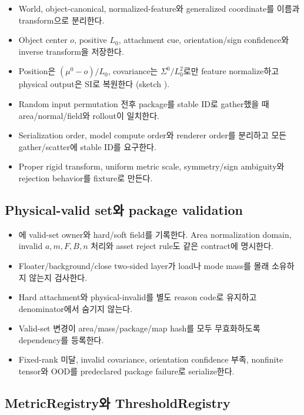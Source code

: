 \documentclass[10pt]{article}
\begin{document}
\begin{itemize}
  \item[$\square$] World, object-canonical, normalized-feature와 generalized coordinate를 이름과 transform으로 분리한다.
  \item[$\square$] Object center \(o\), positive \(L_0\), attachment cue, orientation/sign confidence와 inverse transform을 저장한다.
  \item[$\square$] Position은 \((\mu^0-o)/L_0\), covariance는 \(\Sigma^0/L_0^2\)로만 feature normalize하고
  physical output은 SI로 복원한다 (sketch ).
  \item[$\square$] Random input permutation 전후 package를 stable ID로 gather했을 때 area/normal/field와 rollout이 일치한다.
  \item[$\square$] Serialization order, model compute order와 renderer order를 분리하고 모든 gather/scatter에 stable ID를 요구한다.
  \item[$\square$] Proper rigid transform, uniform metric scale, symmetry/sign ambiguity와 rejection behavior를 fixture로 만든다.
\end{itemize}

\subsection{Physical-valid set와 package validation}

\begin{itemize}
  \item[$\square$] 에 valid-set owner와 hard/soft field를 기록한다.
  Area normalization domain, invalid \(a,m,F,B,n\) 처리와 asset reject rule도 같은 contract에 명시한다.
  \item[$\square$] Floater/background/close two-sided layer가 load나 mode mass를 몰래 소유하지 않는지 검사한다.
  \item[$\square$] Hard attachment와 physical-invalid를 별도 reason code로 유지하고 denominator에서 숨기지 않는다.
  \item[$\square$] Valid-set 변경이 area/mass/package/map hash를 모두 무효화하도록 dependency를 등록한다.
  \item[$\square$] Fixed-rank 미달, invalid covariance, orientation confidence 부족, nonfinite tensor와 OOD를
  predeclared package failure로 serialize한다.
\end{itemize}

\subsection{MetricRegistry와 ThresholdRegistry}
\end{document}
